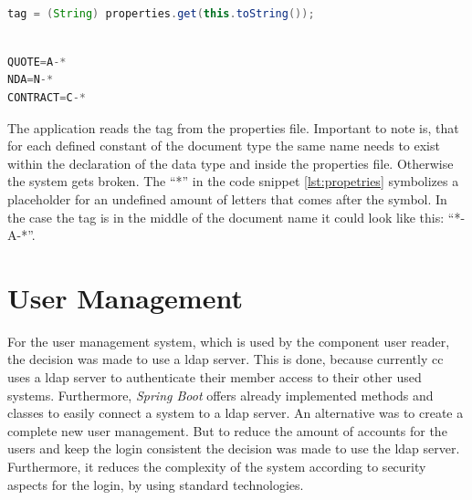 \begin{lstlisting}[language=Java,caption={Reading of tag from document type}, captionpos=b]

tag = (String) properties.get(this.toString());

\end{lstlisting}

\begin{lstlisting}[language=Java,caption={Properties file for document type}, captionpos=b,label=lst:propetries]

QUOTE=A-*
NDA=N-*
CONTRACT=C-*

\end{lstlisting}

The application reads the tag from the properties file. Important to note is, that for each defined constant of the document type the same name needs to exist within the declaration of the data type and inside the properties file. Otherwise the system gets broken. \newline
The ``*'' in the code snippet \ref{lst:propetries} symbolizes a placeholder for an undefined amount of letters that comes after the symbol. In the case the tag is in the middle of the document name it could look like this: ``*-A-*''.

\section{User Management}\label{sec:userManagement}
For the user management system, which is used by the component user reader, the decision was made to use a \gls{ldap} server. This is done, because currently \gls{cc} uses a \gls{ldap} server to authenticate their member access to their other used systems. Furthermore, \textit{Spring Boot} offers already implemented methods and classes to easily connect a system to a \gls{ldap} server. An alternative was to create a complete new user management. But to reduce the amount of accounts for the users and keep the login consistent the decision was made to use the \gls{ldap} server. Furthermore, it reduces the complexity of the system according to security aspects for the login, by using standard technologies.


